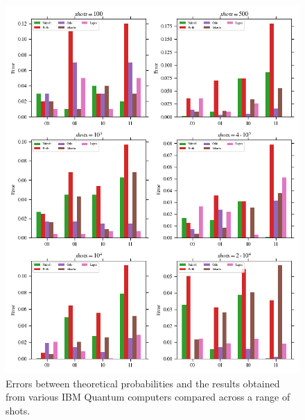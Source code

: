 \begin{figure}[h!]
\centering
\includegraphics[width=\textwidth]{images/quantum_benchmark_error.png}
\caption{Errors between theoretical probabilities and the results obtained from various IBM Quantum computers compared across a range of shots.}
\label{fig:quantum_benchmark_error}
\end{figure}

